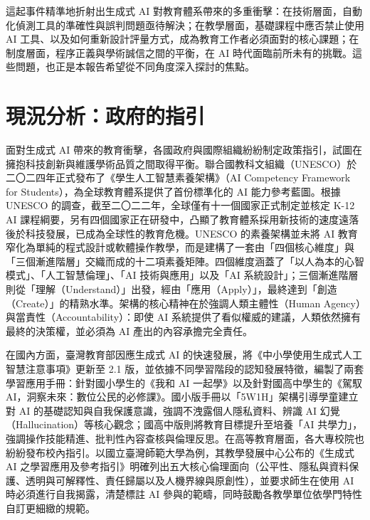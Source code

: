 這起事件精準地折射出生成式 AI 對教育體系帶來的多重衝擊：在技術層面，自動化偵測工具的準確性與誤判問題亟待解決；在教學層面，基礎課程中應否禁止使用 AI 工具、以及如何重新設計評量方式，成為教育工作者必須面對的核心課題；在制度層面，程序正義與學術誠信之間的平衡，在 AI 時代面臨前所未有的挑戰。這些問題，也正是本報告希望從不同角度深入探討的焦點。

\section{現況分析：政府的指引}\label{sec:政府指引}

面對生成式 AI 帶來的教育衝擊，各國政府與國際組織紛紛制定政策指引，試圖在擁抱科技創新與維護學術品質之間取得平衡。聯合國教科文組織（UNESCO）於二〇二四年正式發布了《學生人工智慧素養架構》（AI Competency Framework for Students），為全球教育體系提供了首份標準化的 AI 能力參考藍圖\cite{unesco2024competency}。根據 UNESCO 的調查，截至二〇二二年，全球僅有十一個國家正式制定並核定 K-12 AI 課程綱要，另有四個國家正在研發中\cite{unesco2022k12}，凸顯了教育體系採用新技術的速度遠落後於科技發展，已成為全球性的教育危機。UNESCO 的素養架構並未將 AI 教育窄化為單純的程式設計或軟體操作教學，而是建構了一套由「四個核心維度」與「三個漸進階層」交織而成的十二項素養矩陣\cite{unesco2024competency}。四個維度涵蓋了「以人為本的心智模式」、「人工智慧倫理」、「AI 技術與應用」以及「AI 系統設計」；三個漸進階層則從「理解（Understand）」出發，經由「應用（Apply）」，最終達到「創造（Create）」的精熟水準。架構的核心精神在於強調人類主體性（Human Agency）與當責性（Accountability）：即使 AI 系統提供了看似權威的建議，人類依然擁有最終的決策權，並必須為 AI 產出的內容承擔完全責任\cite{unesco2024competency}。

在國內方面，臺灣教育部因應生成式 AI 的快速發展，將《中小學使用生成式人工智慧注意事項》更新至 2.1 版，並依據不同學習階段的認知發展特徵，編製了兩套學習應用手冊：針對國小學生的《我和 AI 一起學》以及針對國高中學生的《駕馭 AI，洞察未來：數位公民的必修課》\cite{govtw2024aiguide}。國小版手冊以「5W1H」架構引導學童建立對 AI 的基礎認知與自我保護意識，強調不洩露個人隱私資料、辨識 AI 幻覺（Hallucination）等核心觀念；國高中版則將教育目標提升至培養「AI 共學力」，強調操作技能精進、批判性內容查核與倫理反思\cite{govtw2024aiguide}。在高等教育層面，各大專校院也紛紛發布校內指引。以國立臺灣師範大學為例，其教學發展中心公布的《生成式 AI 之學習應用及參考指引》明確列出五大核心倫理面向（公平性、隱私與資料保護、透明與可解釋性、責任歸屬以及人機界線與原創性），並要求師生在使用 AI 時必須進行自我揭露，清楚標註 AI 參與的範疇，同時鼓勵各教學單位依學門特性自訂更細緻的規範\cite{ntnu2025ai}。

